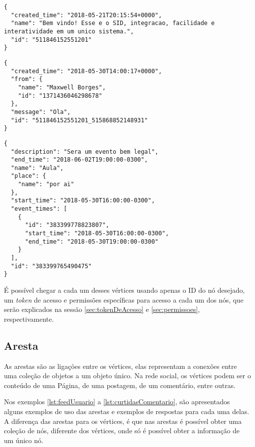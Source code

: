 \begin{lstlisting}[caption={Resposta do servidor a uma requisição \ref{lst:postagem} (Postagem)},label={lst:retornoPostagem}]
{
  "created_time": "2018-05-21T20:15:54+0000",
  "name": "Bem vindo! Esse e o SID, integracao, facilidade e interatividade em um unico sistema.",
  "id": "511846152551201"
}
\end{lstlisting}

\begin{lstlisting}[caption={Resposta do servidor a uma requisição \ref{lst:comentario} (Comentário)},label={lst:retornoComentario}]
{
  "created_time": "2018-05-30T14:00:17+0000",
  "from": {
    "name": "Maxwell Borges",
    "id": "1371436046298678"
  },
  "message": "Ola",
  "id": "511846152551201_515868852148931"
}
\end{lstlisting}

\begin{lstlisting}[caption={Resposta do servidor a uma requisição \ref{lst:evento} (Evento)},label={lst:retornoEvento}]
{
  "description": "Sera um evento bem legal",
  "end_time": "2018-06-02T19:00:00-0300",
  "name": "Aula",
  "place": {
    "name": "por ai"
  },
  "start_time": "2018-05-30T16:00:00-0300",
  "event_times": [
    {
      "id": "383399778823807",
      "start_time": "2018-05-30T16:00:00-0300",
      "end_time": "2018-05-30T19:00:00-0300"
    }
  ],
  "id": "383399765490475"
}
\end{lstlisting}

É possível chegar a cada um desses vértices usando apenas o ID do nó desejado, um \textit{token} de acesso e permissões específicas para acesso a cada um dos nós, que serão explicados na sessão \ref{sec:tokenDeAcesso} e \ref{sec:permissoes}, respectivamente.

\subsection{Aresta}
As arestas são as ligações entre os vértices, elas representam a conexões entre uma coleção de objetos a um objeto único. Na rede social, os vértices podem ser o conteúdo de uma Página, de uma postagem, de um comentário, entre outras.

Nos exemplos \ref{lst:feedUsuario} a \ref{lst:curtidasComentario}, são apresentados alguns exemplos de uso das arestas e exemplos de respostas para cada uma delas. A diferença das arestas para os vértices, é que nas arestas é possível obter uma coleção de nós, diferente dos vértices, onde só é possível obter a informação de um único nó.

